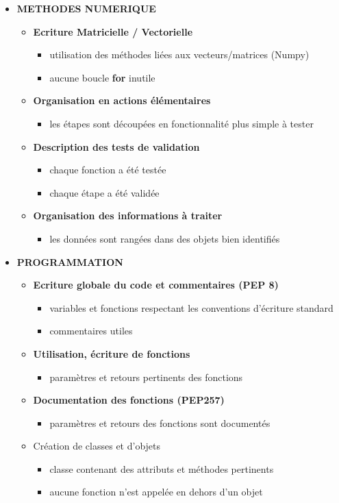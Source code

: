 \begin{itemize}
	\item \textbf{METHODES NUMERIQUE}
	\begin{itemize}
		\item \textbf{Ecriture Matricielle / Vectorielle}
		\begin{itemize}
			\item utilisation des méthodes liées aux vecteurs/matrices (Numpy)
			\item aucune boucle \textbf{for} inutile
		\end{itemize}		 
		\item \textbf{Organisation en actions élémentaires}
		\begin{itemize}
			\item les étapes sont découpées en fonctionnalité plus simple à tester
		\end{itemize}
		\item \textbf{Description des tests de validation}
		\begin{itemize}
			\item chaque fonction a été testée
			\item chaque étape a été validée
		\end{itemize}
		\item \textbf{Organisation des informations à traiter}
		\begin{itemize}
			\item les données sont rangées dans des objets bien identifiés
		\end{itemize}
	\end{itemize}


	\item \textbf{PROGRAMMATION}
	\begin{itemize}
		\item \textbf{Ecriture globale du code et commentaires (PEP 8)}
		\begin{itemize}
			\item variables et fonctions respectant les conventions d'écriture standard
			\item commentaires utiles
		\end{itemize}		 
		\item \textbf{Utilisation, écriture de fonctions}
		\begin{itemize}
			\item paramètres et retours pertinents des fonctions
		\end{itemize}
		\item \textbf{Documentation des fonctions (PEP257)}
		\begin{itemize}
			\item paramètres et retours des fonctions sont documentés
		\end{itemize}
		\item Création de classes et d'objets
		\begin{itemize}
			\item classe contenant des attributs et méthodes pertinents
			\item aucune fonction n'est appelée en dehors d'un objet
		\end{itemize}
	\end{itemize}
	


\end{itemize}
